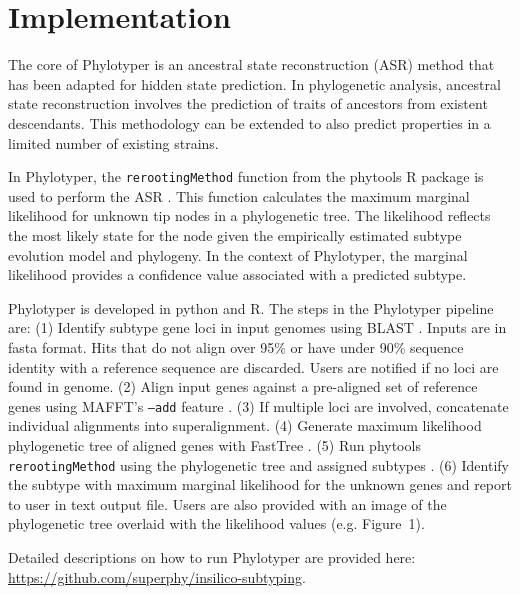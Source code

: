 \documentclass{bioinfo}
\begin{document}
\section{Implementation}

The core of Phylotyper is an ancestral state reconstruction (ASR) method that has been adapted for hidden state prediction.
In phylogenetic analysis, ancestral state reconstruction involves the prediction of traits of ancestors from existent descendants.
This methodology can be extended to also predict properties in a limited number of existing strains.

In Phylotyper, the \texttt{rerootingMethod} function from the phytools R package is used to perform the ASR \citep{Revell2011}.
This function calculates the maximum marginal likelihood for unknown tip nodes in a phylogenetic tree.
The likelihood reflects the most likely state for the node given the empirically estimated subtype evolution model and phylogeny.
In the context of Phylotyper, the marginal likelihood provides a confidence value associated with a predicted subtype.

Phylotyper is developed in python and R. 
The steps in the Phylotyper pipeline are: 
(1) Identify subtype gene loci in input genomes using BLAST \citep{Camacho2009}. Inputs are in fasta format. Hits that do not align over 95\% or have under 90\% sequence identity with a reference sequence are discarded. Users are notified if no loci are found in genome.
(2) Align input genes against a pre-aligned set of reference genes using MAFFT's \texttt{--add} feature \citep{Katoh2013}.
(3) If multiple loci are involved, concatenate individual alignments into superalignment.
(4) Generate maximum likelihood phylogenetic tree of aligned genes with FastTree \citep{Price2010}.
(5) Run phytools \texttt{rerootingMethod} using the phylogenetic tree and assigned subtypes \citep{Revell2011}.
(6) Identify the subtype with maximum marginal likelihood for the unknown genes and report to user in text output file.
Users are also provided with an image of the phylogenetic tree overlaid with the likelihood values (e.g. Figure~1\vphantom{\ref{fig:01}}).

Detailed descriptions on how to run Phylotyper are provided here: \url{https://github.com/superphy/insilico-subtyping}.
\end{document}

